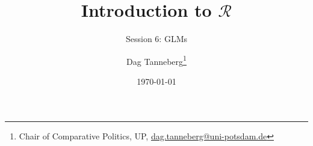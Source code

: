 \usepackage[utf8]{inputenc}
\usepackage{hyperref}
\usepackage{graphicx}
\usepackage{booktabs}
\usepackage{multirow}

\title{Introduction to $\mathcal{R}$}
\subtitle{Session 6: GLMs}
\author{Dag Tanneberg\thanks{%
  Chair of Comparative Politics, UP, %
  \href{mailto:dag.tanneberg@uni-potsdam.de}%
    {dag.tanneberg@uni-potsdam.de}
  }
}
\date{\today}

\hypersetup{colorlinks, urlcolor = red, linkcolor = }
